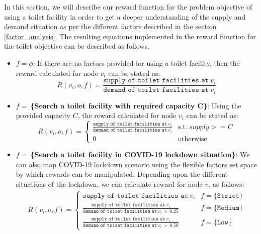 In this section, we will describe our reward function for the problem objective of using a toilet facility in order to get a deeper understanding of the supply and demand situation as per the different factors described in the section \ref{factor_analysis}. The resulting equations implemented in the reward function for the toilet objective can be described as follows.
\begin{itemize}
    \item \textbf{$f=\phi$}: If there are no factors provided for using a toilet facility, then the reward calculated for node $v_i$ can be stated as:
    \begin{equation}
        R(v_i,o,f) = \frac{\texttt{supply of toilet facilities at}\:v_i}{\texttt{demand of toilet facilities at}\:v_i}
    \end{equation}
    
    \item \textbf{$f=\:$\{Search a toilet facility with required capacity C\}}: Using the provided capacity $C$, the reward calculated for node $v_i$ can be stated as:
    \begin{equation}
        R(v_i,o,f) = \begin{cases}
          \frac{\texttt{supply of toilet facilities at}\:v_i}{\texttt{demand of toilet facilities at}\:v_i} & \text{s.t.}\:supply >= C\\    
          0 & \text{otherwise}
        \end{cases}
    \end{equation}
    
    \item \textbf{$f=\:$\{Search a toilet facility in COVID-19 lockdown situation\}}: We can also map COVID-19 lockdown scenario using the flexible factors set space by which rewards can be manipulated. Depending upon the different situations of the lockdown, we can calculate reward for node $v_i$ as follows:
    \begin{gather}
        R(v_i,o,f) =
        \begin{cases}\texttt{supply of toilet facilities at}\:v_i & f=\texttt{\{Strict\}} \\
         \frac{\texttt{supply of toilet facilities at}\:v_i}{\texttt{demand of toilet facilities at}\:v_i\:\times\:0.25} & f=\texttt{\{Medium\}}\\
         \frac{\texttt{supply of toilet facilities at}\:v_i}{\texttt{demand of toilet facilities at}\:v_i\:\times\:0.50} & f=\texttt{\{Low\}}
        \end{cases}
    \end{gather}
    

\end{itemize}
